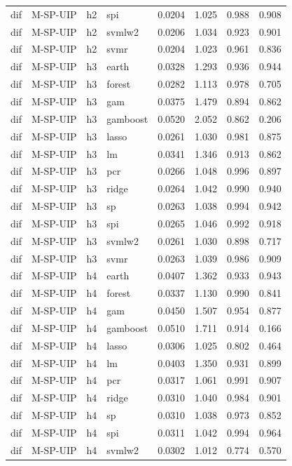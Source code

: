 \begin{ThreePartTable}
\begin{longtable}[t]{llclcccc}
dif & M-SP-UIP & h2 & spi & 0.0204 & 1.025 & 0.988 & 0.908\\
dif & M-SP-UIP & h2 & svmlw2 & 0.0206 & 1.034 & 0.923 & 0.901\\
dif & M-SP-UIP & h2 & svmr & 0.0204 & 1.023 & 0.961 & 0.836\\
\addlinespace
dif & M-SP-UIP & h3 & earth & 0.0328 & 1.293 & 0.936 & 0.944\\
dif & M-SP-UIP & h3 & forest & 0.0282 & 1.113 & 0.978 & 0.705\\
dif & M-SP-UIP & h3 & gam & 0.0375 & 1.479 & 0.894 & 0.862\\
dif & M-SP-UIP & h3 & gamboost & 0.0520 & 2.052 & 0.862 & 0.206\\
dif & M-SP-UIP & h3 & lasso & 0.0261 & 1.030 & 0.981 & 0.875\\
dif & M-SP-UIP & h3 & lm & 0.0341 & 1.346 & 0.913 & 0.862\\
dif & M-SP-UIP & h3 & pcr & 0.0266 & 1.048 & 0.996 & 0.897\\
dif & M-SP-UIP & h3 & ridge & 0.0264 & 1.042 & 0.990 & 0.940\\
dif & M-SP-UIP & h3 & sp & 0.0263 & 1.038 & 0.994 & 0.942\\
dif & M-SP-UIP & h3 & spi & 0.0265 & 1.046 & 0.992 & 0.918\\
dif & M-SP-UIP & h3 & svmlw2 & 0.0261 & 1.030 & 0.898 & 0.717\\
dif & M-SP-UIP & h3 & svmr & 0.0263 & 1.039 & 0.986 & 0.909\\
\addlinespace
dif & M-SP-UIP & h4 & earth & 0.0407 & 1.362 & 0.933 & 0.943\\
dif & M-SP-UIP & h4 & forest & 0.0337 & 1.130 & 0.990 & 0.841\\
dif & M-SP-UIP & h4 & gam & 0.0450 & 1.507 & 0.954 & 0.877\\
dif & M-SP-UIP & h4 & gamboost & 0.0510 & 1.711 & 0.914 & 0.166\\
dif & M-SP-UIP & h4 & lasso & 0.0306 & 1.025 & 0.802 & 0.464\\
dif & M-SP-UIP & h4 & lm & 0.0403 & 1.350 & 0.931 & 0.899\\
dif & M-SP-UIP & h4 & pcr & 0.0317 & 1.061 & 0.991 & 0.907\\
dif & M-SP-UIP & h4 & ridge & 0.0310 & 1.040 & 0.984 & 0.901\\
dif & M-SP-UIP & h4 & sp & 0.0310 & 1.038 & 0.973 & 0.852\\
dif & M-SP-UIP & h4 & spi & 0.0311 & 1.042 & 0.994 & 0.964\\
dif & M-SP-UIP & h4 & svmlw2 & 0.0302 & 1.012 & 0.774 & 0.570\\

\end{longtable}
\end{ThreePartTable}
